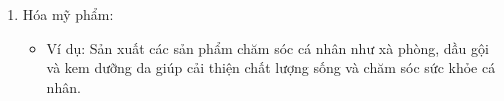 \documentclass[Main.tex]{subfiles}
\begin{document}
\begin{bt}
{\begin{enumerate}
			\begin{itemize}
				\item  Ví dụ: Quá trình bảo quản thực phẩm bằng cách sử dụng các chất bảo quản và chất chống oxi hóa giúp kéo dài thời gian sử dụng và đảm bảo an toàn thực phẩm.
			\end{itemize}
			\item  Hóa mỹ phẩm:
			\begin{itemize}
				\item  Ví dụ: Sản xuất các sản phẩm chăm sóc cá nhân như xà phòng, dầu gội và kem dưỡng da giúp cải thiện chất lượng sống và chăm sóc sức khỏe cá nhân.
			\end{itemize}
		\end{enumerate}
		}
	\end{bt}
\end{document}

